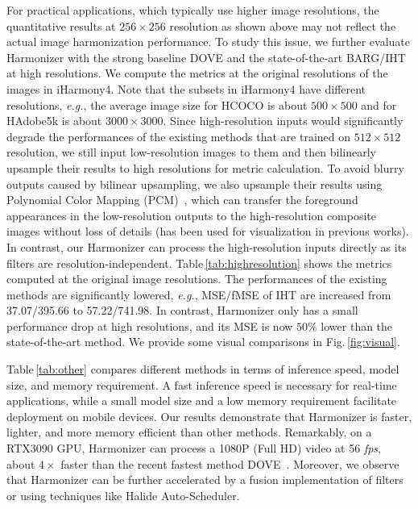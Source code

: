 \documentclass[runningheads]{llncs}
\newcommand{\ke}[1]{{\color{black}#1}}
\begin{document}
For practical applications, which typically use higher image resolutions, the quantitative results at $256\times256$ resolution as shown above may not reflect the actual image harmonization performance. To study this issue, we further evaluate Harmonizer with the strong baseline DOVE and the state-of-the-art BARG/IHT at high resolutions. We compute the metrics at the original resolutions of the images in iHarmony4. Note that the subsets in iHarmony4 have different resolutions, {\it e.g.}, the average image size for HCOCO is about $500\times500$ and for HAdobe5k is about $3000\times3000$.
Since high-resolution inputs would significantly degrade the performances of the existing methods \ke{that are trained on $512\times512$ resolution}, we still input low-resolution images to them and then bilinearly upsample their results to high resolutions for metric calculation. \ke{To avoid blurry outputs caused by bilinear upsampling,}
we also upsample their results using Polynomial Color Mapping (PCM)~\cite{afifi2020deepWB}, which can transfer the foreground appearances in the low-resolution outputs to the high-resolution composite images without loss of details (has been used for visualization in previous works). In contrast, our Harmonizer can process the high-resolution inputs directly as its filters are resolution-independent.
Table\,\ref{tab:highresolution} shows the metrics computed at the original image resolutions. The performances of the existing methods are significantly lowered, {\it e.g.}, MSE/fMSE of IHT are increased from 37.07/395.66 to 57.22/741.98. In contrast, Harmonizer only has a small performance drop at high resolutions, and its MSE is now $50\%$ lower than the state-of-the-art method. We provide some visual comparisons in Fig.\,\ref{fig:visual}.

Table\,\ref{tab:other} compares different methods in terms of inference speed, model size, and memory requirement. A fast inference speed is necessary for real-time applications, while a small model size and a low memory requirement facilitate deployment on mobile devices. 
Our results demonstrate that Harmonizer is faster, lighter, and more memory efficient than other methods. Remarkably, on a RTX3090 GPU, Harmonizer can process a 1080P (Full HD) video at 56 {\it fps}, about $4\times$ faster than the recent fastest method DOVE~\cite{DoveNet}. Moreover, we observe that Harmonizer can be further accelerated by a fusion implementation of filters or using techniques like Halide Auto-Scheduler.
\end{document}
